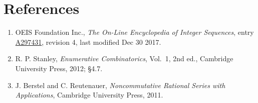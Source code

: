 \documentclass[11pt]{article}
\theoremstyle{definition}
\begin{document}
\section{References}

\begin{enumerate}

\item OEIS Foundation Inc., \emph{The On-Line Encyclopedia of Integer Sequences}, entry \href{https://oeis.org/A297431}{A297431}, revision 4, last modified Dec 30 2017.

\item R. P. Stanley, \emph{Enumerative Combinatorics}, Vol.~1, 2nd ed., Cambridge University Press, 2012; \S4.7.

\item J. Berstel and C. Reutenauer, \emph{Noncommutative Rational Series with Applications}, Cambridge University Press, 2011.

\end{enumerate}
\end{document}
